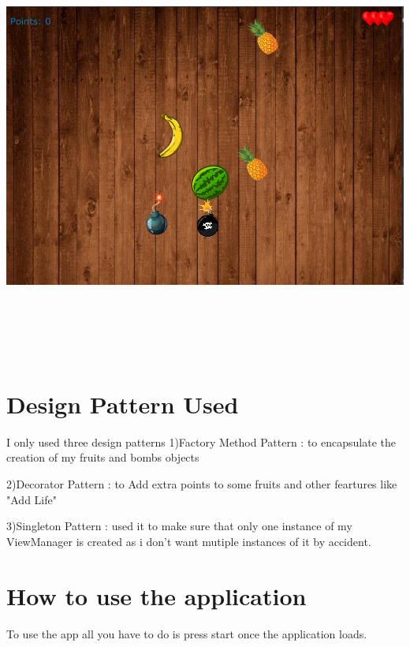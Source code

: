 \documentclass[10pt,a4paper,oneside]{article}
\begin{document}
\begin{samepage}
\includegraphics[width=15cm,height=14cm,keepaspectratio]{gui2.png}

\end{samepage}

\section{Design Pattern Used}

I only used three design patterns
1)Factory Method Pattern : to encapsulate the creation of my fruits and bombs objects


2)Decorator Pattern : to Add extra points to some fruits and other feartures like "Add Life"


3)Singleton Pattern : used it to make sure that only one instance of my ViewManager is created as i don't want mutiple instances of it by accident. 

\section{How to use the application}
To use the app all you have to do is press start once the application loads. 
\end{document}
